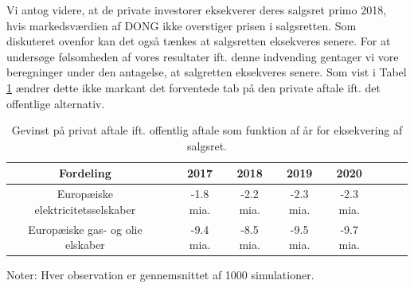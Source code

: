 \documentclass{article}
\begin{document}
Vi antog videre, at de private investorer eksekverer deres salgsret primo 2018, hvis markedsværdien af DONG ikke overstiger prisen i salgsretten. Som diskuteret ovenfor kan det også tænkes at salgsretten eksekveres senere. For at undersøge følsomheden af vores resultater ift. denne indvending gentager vi vore beregninger under den antagelse, at salgretten eksekveres senere. Som vist i Tabel \ref{tab:robust_aar} ændrer dette ikke markant det forventede tab på den private aftale ift. det offentlige alternativ.

\begin{table}[h]
	\caption{Gevinst på privat aftale ift. offentlig aftale som funktion af \aa{}r for eksekvering af salgsret.}  
	\label{tab:robust_aar}
	\begin{tabularx}{\linewidth}{cXccccccr}
	\toprule[1pt]
	Fordeling && 2017 & 2018 & 2019 & 2020 \\
	\hline 
		Europ\ae{}iske elektricitetsselskaber && -1.8 mia. & -2.2 mia. & -2.3 mia. & -2.3 mia. \\
	Europ\ae{}iske gas- og olie elskaber && -9.4 mia. & -8.5 mia. & -9.5 mia.  &  -9.7 mia.  \\
		\bottomrule[1pt]
	\end{tabularx}
	\begin{minipage}{\linewidth}
		\footnotesize{Noter: Hver observation er gennemsnittet af 1000 simulationer.}
	\end{minipage}
\end{table}




\FloatBarrier




\newpage



\end{document}
